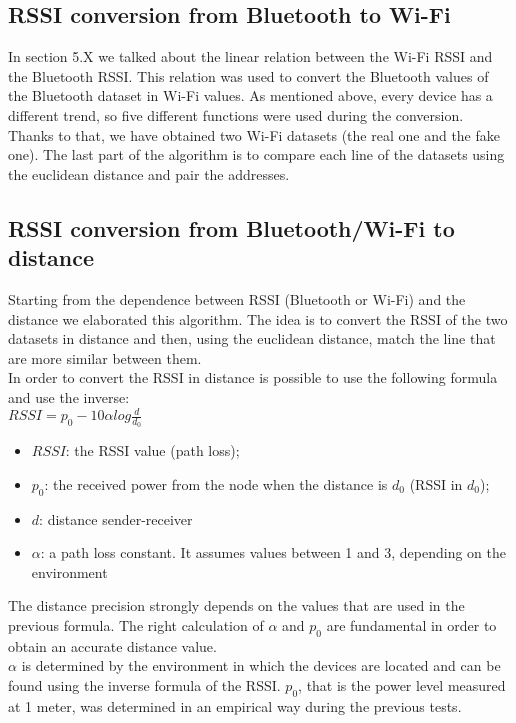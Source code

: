 \subsection{RSSI conversion from Bluetooth to Wi-Fi}
In section 5.X we talked about the linear relation between the Wi-Fi RSSI and the Bluetooth RSSI. This relation was used to convert the Bluetooth values of the Bluetooth dataset in Wi-Fi values. As mentioned above, every device has a different trend, so five different functions were used during the conversion.\\
Thanks to that, we have obtained two Wi-Fi datasets (the real one and the fake one). The last part of the algorithm is to compare each line of the datasets using the euclidean distance and pair the addresses.

\subsection{RSSI conversion from Bluetooth/Wi-Fi to distance}
Starting from the dependence between RSSI (Bluetooth or Wi-Fi) and the distance we elaborated this algorithm. The idea is to convert the RSSI of the two datasets in distance and then, using the euclidean distance, match the line that are more similar between them.\\
\linebreak
In order to convert the RSSI in distance is possible to use the following formula and use the inverse:\\
\(RSSI = p_0 - 10 \alpha log{\frac{d}{d_0}}\)\\
\begin{itemize}
\item \(RSSI\): the RSSI value (path loss);
\item \(p_0\): the received power from the node when the distance is \(d_0\) (RSSI in \(d_0\));
\item \(d\): distance sender-receiver
\item \(\alpha\): a path loss constant. It assumes values between 1 and 3, depending on the environment
\end{itemize}
The distance precision strongly depends on the values that are used in the previous formula. The right calculation of \(\alpha\) and \(p_0\) are fundamental in order to obtain an accurate distance value.\\
\(\alpha\) is determined by the environment in which the devices are located and can be found using the inverse formula of the RSSI. \(p_0\), that is the power level measured at 1 meter, was determined in an empirical way during the previous tests.\\
